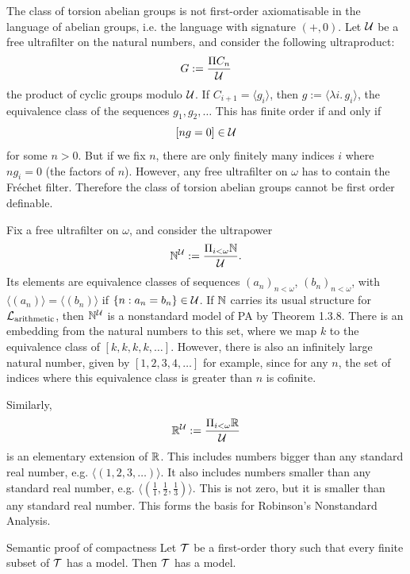\documentclass{article}
\numberwithin{thm}{subsection}
\begin{document}
\begin{ex}{}
    The class of torsion abelian groups is not first-order axiomatisable in the language of abelian groups, i.e. the language with signature $(+,0)$.\gap
    Let $\mathcal{U}$ be a free ultrafilter on the natural numbers, and consider the following ultraproduct: \[ G := \frac{\Pi C_{n}}{\mathcal{U}}\] the product of cyclic groups modulo $\mathcal{U}$. \gap If $C_{i+1}=\langle g_{i} \rangle$, then $g := \langle \lambda i. \, g_{i} \rangle$, the equivalence class of the sequences $g_{1},g_{2},\dots$ This has finite order if and only if \[ [ng = 0] \in \mathcal{U}\] for some $n>0$. But if we fix $n$, there are only finitely many indices $i$ where $ng_{i}=0$ (the factors of $n$). However, any free ultrafilter on $\omega$ has to contain the Fr\'echet filter. Therefore the class of torsion abelian groups cannot be first order definable.
\end{ex}
\begin{ex}{}
    Fix a free ultrafilter on $\omega$, and consider the ultrapower \[ \mathbb{N}^{\mathcal{U}} := \frac{\Pi_{i<\omega} \mathbb{N}}{\mathcal{U}}.\] Its elements are equivalence classes of sequences $(a_{n})_{n<\omega}$, $(b_{n})_{n<\omega}$, with $\langle (a_{n}) \rangle = \langle (b_{n}) \rangle$ if $\{ n: a_{n} = b_{n}\} \in \mathcal{U}$. If $\mathbb{N}$ carries its usual structure for $\mathcal{L}_{\text{arithmetic}}$, then $\mathbb{N}^{\mathcal{U}}$ is a nonstandard model of PA by Theorem 1.3.8. There is an embedding from the natural numbers to this set, where we map $k$ to the equivalence class of $[k,k,k,k,\dots]$. However, there is also an infinitely large natural number, given by $[1,2,3,4,\dots]$ for example, since for any $n$, the set of indices where this equivalence class is greater than $n$ is cofinite.
\end{ex}
\begin{ex}{}
    Similarly, \[ \mathbb{R}^{\mathcal{U}} := \frac{\Pi_{i< \omega} \mathbb{R}}{\mathcal{U}}\] is an elementary extension of $\mathbb{R}$. This includes  numbers bigger than any standard real number, e.g. $\langle (1,2,3,\dots) \rangle$. It also includes  numbers smaller than any standard real number, e.g. $\langle (\frac{1}{1},\frac{1}{2},\frac{1}{3}) \rangle$. This is not zero, but it is smaller than any standard real number. This forms the basis for Robinson's Nonstandard Analysis.
\end{ex}
\begin{corr}{Semantic proof of compactness}
    Let $\mathcal{T}$ be a first-order thory such that every finite subset of $\mathcal{T}$ has a model. Then $\mathcal{T}$ has a model.
\end{corr}
\end{document}
